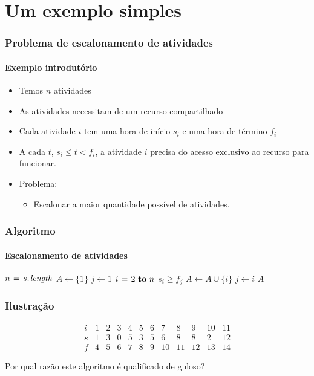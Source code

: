 \documentclass{beamer}
\begin{document}
\section{Um exemplo simples}


\begin{frame}
\frametitle{Problema de escalonamento de atividades}
\framesubtitle{Exemplo introdutório}

\begin{itemize}
\item Temos $n$ atividades
\item As atividades necessitam de um recurso compartilhado
\item Cada atividade $i$ tem uma hora de início $s_i$
e uma hora de término $f_i$
\item A cada $t$, $s_i \le t < f_i$, a atividade $i$ precisa
do acesso exclusivo ao recurso para funcionar.
\item Problema:
\begin{itemize}
\item Escalonar a maior quantidade possível de atividades.
\end{itemize}
\end{itemize}

\end{frame}


\begin{frame}
\frametitle{Algoritmo}
\framesubtitle{Escalonamento de atividades}

\begin{codebox}
\zi {}
\li $n \gets \attrib{s}{length}$
\zi {}
\li $A \gets \{ 1 \}$  
\zi {}
\li $j \gets 1$
\li \For $i \gets 2 \To n$ 
\li \Do \If $s_i \ge f_j$
\li   \Then $A \gets A \cup \{ i \}$
\li     $j \gets i$
      \End
    \End
\li \Return $A$
\end{codebox}

\end{frame}


\begin{frame}
\frametitle{Ilustração}

$$
\begin{array}{|c|c|c|c|c|c|c|c|c|c|c|c|}
i & 1 & 2 & 3 & 4 & 5 & 6 & 7 & 8 & 9 & 10 & 11 \\
\hline
\hline
s & 1 & 3 & 0 & 5 & 3 & 5 & 6 & 8 & 8 & 2 & 12 \\
\hline
f & 4 & 5 & 6 & 7 & 8 & 9 & 10 & 11 & 12 & 13 & 14
\end{array}
$$

\pause
Por qual razão este algoritmo é qualificado de \alert{guloso}?

\end{frame}
\end{document}
